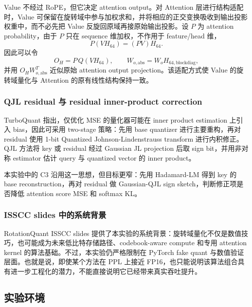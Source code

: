 \documentclass[lang=cn,chinesefont=nofont,a4paper,newtx]{elegantpaper}
\begin{document}
Value 不经过 RoPE，但它决定 attention output。对 Attention 层进行结构适配时，Value 可保留在旋转域中参与加权求和，并将相应的正交变换吸收到输出投影权重中，而不必先把 Value 反旋回原域再接原始输出投影。设 $P$ 为 attention probability，由于 $P$ 只在 sequence 维加权，不作用于 feature/head 维，
\begin{equation}
  P(VH_{64}) = (PV)H_{64}.
\end{equation}
因此可以令
\begin{equation}
  O_H = P\,Q(VH_{64}), \qquad
  W_{o,\mathrm{abs}} = W_o H_{64,\mathrm{blockdiag}},
\end{equation}
并用 $O_H W_{o,\mathrm{abs}}^{T}$ 近似原始 attention output projection。该适配方式使 Value 的旋转域量化与 Attention 的原有线性结构保持一致。

\subsubsection{QJL residual 与 residual inner-product correction}

TurboQuant 指出，仅优化 MSE 的量化器可能在 inner product estimation 上引入 bias，因此可采用 two-stage 策略：先用 base quantizer 进行主要重构，再对 residual 使用 1-bit Quantized Johnson-Lindenstrauss transform 进行内积修正\cite{turboquant2025}。QJL 方法将 key 或 residual 经过 Gaussian JL projection 后取 sign bit，并用非对称 estimator 估计 query 与 quantized vector 的 inner product\cite{qjl}。

本实验中的 C3 沿用这一思想，但目标更窄：先用 Hadamard-LM 得到 key 的 base reconstruction，再对 residual 做 Gaussian-QJL sign sketch，判断修正项是否降低 attention score MSE 和 softmax KL。

\subsubsection{ISSCC slides 中的系统背景}

RotationQuant ISSCC slides 提供了本实验的系统背景：旋转域量化不仅是数值技巧，也可能成为未来低比特存储路径、codebook-aware compute 和专用 attention kernel 的算法基础\cite{rotationquant2026isscc}。不过，本实验仍严格限制在 PyTorch fake quant 与数值验证层面。也就是说，即使某个方法在 PPL 上接近 FP16，也只能说明该算法组合具有进一步工程化的潜力，不能直接说明它已经带来真实吞吐提升。

\subsection{实验环境}
\end{document}
